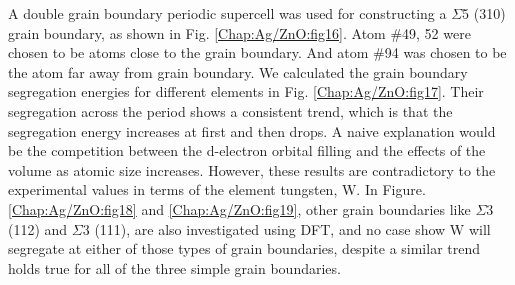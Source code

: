 A double grain boundary periodic supercell was used for constructing a $\Sigma$5 (310) grain boundary, as shown in Fig. \ref{Chap:Ag/ZnO:fig16}. Atom \#49, 52 were chosen to be atoms close to the grain boundary. And atom \#94 was chosen to be the atom far away from grain boundary. We calculated the grain boundary segregation energies for different elements in Fig. \ref{Chap:Ag/ZnO:fig17}. Their segregation across the period shows a consistent trend, which is that the segregation energy increases at first and then drops. A naive explanation would be the competition between the d-electron orbital filling and the effects of the volume as atomic size increases. However, these results are contradictory to the experimental values in terms of the element tungsten, W. \cite{chookajorn2012design,jiao2018nanocrystalline} In Figure. \ref{Chap:Ag/ZnO:fig18} and \ref{Chap:Ag/ZnO:fig19}, other grain boundaries like $\Sigma$3 (112) and $\Sigma$3 (111), are also investigated using \ac{DFT}, and no case show W will segregate at either of those types of grain boundaries, despite a similar trend holds true for all of the three simple grain boundaries.

